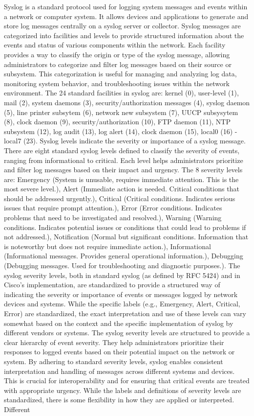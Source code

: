 \documentclass{article}
\begin{document}
	Syslog is a standard protocol used for logging system messages and events within a network or computer system. It allows devices and applications to generate and store log messages centrally on a syslog server or collector. Syslog messages are categorized into facilities and levels to provide structured information about the events and status of various components within the network. Each facility provides a way to classify the origin or type of the syslog message, allowing administrators to categorize and filter log messages based on their source or subsystem. This categorization is useful for managing and analyzing log data, monitoring system behavior, and troubleshooting issues within the network environment. The 24 standard facilities in syslog are: kernel (0), user-level (1), mail (2), system daemons (3), security/authorization messages (4), syslog daemon (5), line printer subsytem (6), network new subsystem (7), UUCP subsysytem (8), clock daemon (9), security/authorization (10), FTP daemon (11), NTP subsystem (12), log audit (13), log alert (14), clock daemon (15), local0 (16) - local7 (23). Syslog levels indicate the severity or importance of a syslog message. There are eight standard syslog levels defined to classify the severity of events, ranging from informational to critical. Each level helps administrators prioritize and filter log messages based on their impact and urgency. The 8 severity levels are: Emergency (System is unusable, requires immediate attention. This is the most severe level.), Alert (Immediate action is needed. Critical conditions that should be addressed urgently.), Critical (Critical conditions. Indicates serious issues that require prompt attention.), Error (Error conditions. Indicates problems that need to be investigated and resolved.), Warning (Warning conditions. Indicates potential issues or conditions that could lead to problems if not addressed.), Notification (Normal but significant conditions. Information that is noteworthy but does not require immediate action.), Informational (Informational messages. Provides general operational information.), Debugging (Debugging messages. Used for troubleshooting and diagnostic purposes.). The syslog severity levels, both in standard syslog (as defined by RFC 5424) and in Cisco's implementation, are standardized to provide a structured way of indicating the severity or importance of events or messages logged by network devices and systems. While the specific labels (e.g., Emergency, Alert, Critical, Error) are standardized, the exact interpretation and use of these levels can vary somewhat based on the context and the specific implementation of syslog by different vendors or systems. The syslog severity levels are structured to provide a clear hierarchy of event severity. They help administrators prioritize their responses to logged events based on their potential impact on the network or system. By adhering to standard severity levels, syslog enables consistent interpretation and handling of messages across different systems and devices. This is crucial for interoperability and for ensuring that critical events are treated with appropriate urgency. While the labels and definitions of severity levels are standardized, there is some flexibility in how they are applied or interpreted. Different 
\end{document}
